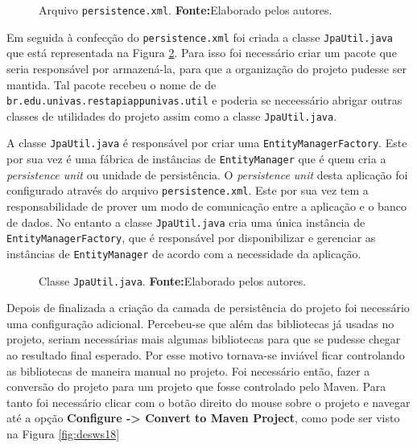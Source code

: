 	\begin{figure}[h!]
		
		\caption[Arquivo \texttt{persistence.xml}]{Arquivo \texttt{persistence.xml}.
		\textbf{Fonte:}Elaborado pelos autores.}
		\label{fig:desws16}
	\end{figure}
	
	\pagebreak
	
	\par Em seguida à confecção do \texttt{persistence.xml} foi criada a
classe \texttt{JpaUtil.java} que está representada na Figura \ref{fig:desws17}.
Para isso foi necessário criar um pacote que seria responsável por armazená-la,
para que a organização do projeto pudesse ser mantida. Tal pacote recebeu o nome de
de \texttt{br.edu.univas.restapiappunivas.util} e poderia se neceessário
abrigar outras classes de utilidades do projeto assim como a classe
\texttt{JpaUtil.java}.
	
	\par A classe \texttt{JpaUtil.java} é responsável por criar uma
\texttt{EntityManagerFactory}. Este por sua vez é uma  fábrica de instâncias de
\texttt{EntityManager} que é quem cria a \textit{persistence unit} ou unidade
de persistência. O \textit{persistence unit} desta aplicação foi configurado
através do arquivo \texttt{persistence.xml}. Este por sua vez tem a
responsabilidade de prover um modo de comunicação entre a aplicação e o banco
de dados. No entanto a classe \texttt{JpaUtil.java} cria uma única instância de
\texttt{EntityManagerFactory}, que é responsável por disponibilizar e gerenciar
as instâncias de \texttt{EntityManager} de acordo com a necessidade da
aplicação.
	
	\begin{figure}[h!]
		
		\caption[Classe \texttt{JpaUtil.java}]{Classe \texttt{JpaUtil.java}.
		\textbf{Fonte:}Elaborado pelos autores.}
		\label{fig:desws17}
	\end{figure}

	\pagebreak
	
	\par Depois de finalizada a criação da camada de persistência do projeto foi
necessário uma configuração adicional. Percebeu-se que além das bibliotecas já
usadas no projeto, seriam necessárias mais algumas bibliotecas para que se
pudesse chegar ao resultado final esperado. Por esse motivo tornava-se inviável
ficar controlando as bibliotecas de maneira manual no projeto. Foi necessário
então, fazer a conversão do projeto para um projeto que fosse controlado pelo
Maven. Para tanto foi necessário clicar com o botão direito do mouse sobre o
projeto e navegar até a opção \textbf{Configure -> Convert to Maven Project},
como pode ser visto na Figura \ref{fig:desws18}

